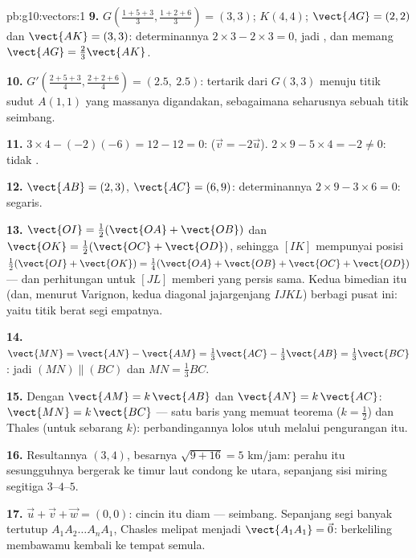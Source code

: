 \begin{solution}{pb:g10:vectors:1}
\textbf{9.} $G\left(\frac{1+5+3}{3}, \frac{1+2+6}{3}\right) =
(3, 3)$; $K(4, 4)$; $\vect{AG} = (2, 2)$ dan
$\vect{AK} = (3, 3)$: determinannya
$2 \times 3 - 2 \times 3 = 0$, jadi , dan memang
$\vect{AG} = \frac23\vect{AK}$.

\textbf{10.} $G'\left(\frac{2 + 5 + 3}{4}, \frac{2 + 2 +
6}{4}\right) = (2.5,\ 2.5)$: tertarik dari $G(3,3)$ menuju
titik sudut $A(1,1)$ yang massanya digandakan, sebagaimana seharusnya
sebuah titik seimbang.

\textbf{11.} $3 \times 4 - (-2)(-6) = 12 - 12 = 0$: 
($\vec v = -2\vec u$). $2 \times 9 - 5 \times 4 = -2 \neq 0$:
tidak .

\textbf{12.} $\vect{AB} = (2, 3)$, $\vect{AC} = (6, 9)$:
determinannya $2 \times 9 - 3 \times 6 = 0$: segaris.

\textbf{13.} $\vect{OI} = \frac12(\vect{OA} + \vect{OB})$ dan
$\vect{OK} = \frac12(\vect{OC} + \vect{OD})$, sehingga 
$[IK]$ mempunyai  posisi
$\frac12(\vect{OI} + \vect{OK}) = \frac14(\vect{OA} +
\vect{OB} + \vect{OC} + \vect{OD})$ --- dan perhitungan
untuk $[JL]$ memberi  yang persis sama. Kedua bimedian itu (dan,
menurut Varignon, kedua diagonal jajargenjang $IJKL$) berbagi
pusat ini: yaitu titik berat segi empatnya.

\textbf{14.} $\vect{MN} = \vect{AN} - \vect{AM} =
\frac13\vect{AC} - \frac13\vect{AB} = \frac13\vect{BC}$:
jadi $(MN) \parallel (BC)$ dan $MN = \frac13 BC$.

\textbf{15.} Dengan $\vect{AM} = k\,\vect{AB}$ dan
$\vect{AN} = k\,\vect{AC}$: $\vect{MN} = k\,\vect{BC}$ --- satu
baris yang memuat teorema  ($k = \frac12$) dan
Thales (untuk sebarang $k$): perbandingannya lolos utuh melalui
pengurangan itu.

\textbf{16.} Resultannya $(3, 4)$, besarnya
$\sqrt{9 + 16} = 5$ km/jam: perahu itu sesungguhnya bergerak
ke timur laut condong ke utara, sepanjang sisi miring segitiga
$3$--$4$--$5$.

\textbf{17.} $\vec u + \vec v + \vec w = (0, 0)$: cincin itu
diam --- seimbang. Sepanjang segi banyak tertutup
$A_1 A_2 \dots A_n A_1$, Chasles melipat  menjadi
$\vect{A_1 A_1} = \vec 0$: berkeliling membawamu kembali ke tempat semula.


\end{solution}
